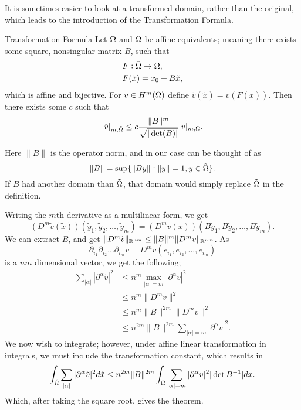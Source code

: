 It is sometimes easier to look at a transformed domain, rather than the original, which leads to the introduction of the Transformation Formula.

\begin{thmx}{Transformation Formula\label{thm:transformation}}
    Let $\Omega$ and $\tilde{\Omega}$ be affine equivalents; meaning 
    there exists some square, nonsingular matrix $B$, such that 
    \begin{align*}
        &F: \tilde{\Omega}\to \Omega, \\
        &F(\tilde{x}) = x_0 + B\tilde{x},
    \end{align*}
    which is affine and bijective. For $v\in H^m(\Omega)$ define 
    $\tilde{v}(\tilde{x}) = v(F(\tilde{x}))$.
    Then there exists some $c$ such that 
    \begin{equation*}
        |\tilde{v}|_{m,\tilde{\Omega}} \leq 
        c \frac{\|B\|^m }{\sqrt{|\det(B)|}}|v|_{m,\Omega}.
    \end{equation*}
\end{thmx}
Here $\|B\|$ is the operator norm, and in our case can be thought of 
as 
\begin{equation*}
    \|B\| = \sup\{ \| By\| :\|y\| = 1, y \in \tilde{\Omega} \}.
\end{equation*}
If $B$ had another domain than $\tilde{\Omega}$, that domain would simply 
replace $\tilde{\Omega}$ in the definition.
\begin{bev}
   Writing the $m$th derivative as a multilinear form, we get 
   \begin{equation*}
    (D^m\tilde{v}(\tilde{x}))(\tilde{y}_1, \tilde{y}_2, \ldots, \tilde{y}_m )=
    (D^m v(x))(B\tilde{y}_1, B\tilde{y}_2, \ldots, B\tilde{y}_m ).
   \end{equation*} 
We can extract $B$, and get $\|D^m \tilde{v}\|_{\mathbb{R}^{nm}} \leq \|B\|^m \|D^m v\|_{\mathbb{R}^{nm}}$.
As 
\[\partial_{i_{1}}\partial_{i_{2}}\ldots \partial_{i_{m}} v = D^m v(e_{i_1},e_{i_2}, \ldots, e_{i_m})\]
is a $nm$ dimensional vector, we get the following;
\begin{align*}
    \sum_{|\alpha|} | \partial ^\alpha \tilde{v} |^2 & \leq n^m \max_{|\alpha|=m} |\partial ^\alpha \tilde{v}|^2 \\
    &\leq n^m \|D^m\tilde{v}\|^2 \\
    &\leq n^m \|B\|^{2m}\|D^m v\|^2 \\
    &\leq n^{2m}\|B\|^{2m} \sum_{|\alpha|=m}|\partial ^\alpha v|^2.
\end{align*}
We now wish to integrate; however, under affine linear transformation in integrals, 
we must include the transformation constant, which results in 
\begin{equation*}
    \int_{\tilde{\Omega}} \sum_{|\alpha|} | \partial ^\alpha \tilde{v} |^2 d\tilde{x}
    \leq n^{2m}\|B\|^{2m}\int_{\Omega} \sum_{|\alpha|=m}|\partial ^\alpha v|^2 |\det B^{-1}| dx.
\end{equation*}
Which, after taking the square root, gives the theorem.
\end{bev}